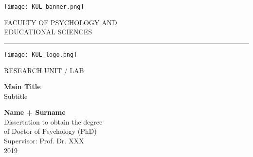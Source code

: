 \begin{titlepage}
	\noindent%
	\begin{minipage}[c][2cm][c]{0.15\textwidth}
		\texttt{[image: KUL\_banner.png]}%
	\end{minipage}%
	\begin{minipage}[c][2cm][c]{0.7\textwidth}
		\begin{flushright}
		 FACULTY OF PSYCHOLOGY AND\\
		 EDUCATIONAL SCIENCES
		\end{flushright}
	\end{minipage}%
	\hspace*{0.2cm}
	\begin{minipage}[c][2cm][c]{0.04\textwidth}
		\textcolor{vertbar}{\rule{0.2cm}{1.3cm}}
	\end{minipage}%
	\begin{minipage}[c][2cm][c]{0.08\textwidth}
		\texttt{[image: KUL\_logo.png]}
	\end{minipage}%
	

	\vspace*{0.8cm}
	\begin{flushright}
		RESEARCH UNIT / LAB
	\end{flushright}
	
	\vspace*{2.7cm}
	\begin{flushleft}
	\Huge
	\textcolor{title}{\textbf{Main Title\\}}
	\vspace{0.2cm}
	\LARGE
 	Subtitle
 	\end{flushleft}
 	
 	\vspace{7.5cm}
	\begin{flushright}
		\large
		\textbf{Name + Surname\\}
		\vspace{0.2cm}
		\normalsize
		Dissertation to obtain the degree\\ 
		of Doctor of Psychology (PhD)\\
		\vspace{0.3cm}
		Supervisor: Prof. Dr. XXX\\
		\vspace{1cm}
		2019		
	\end{flushright}	
\end{titlepage}